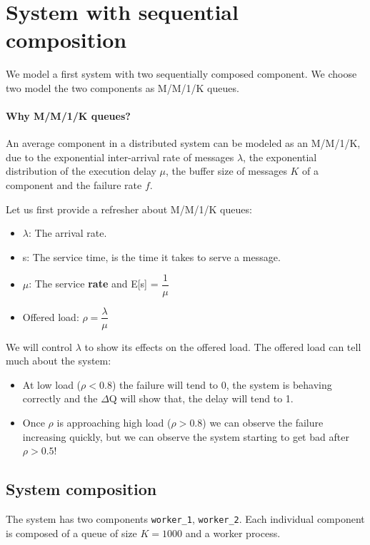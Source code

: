 \section{System with sequential composition}
    We model a first system with two sequentially composed component. We choose two model the two components as M/M/1/K queues. 
   
   \paragraph{Why M/M/1/K queues?} An average component in a distributed system can be modeled as an M/M/1/K, due to the exponential inter-arrival rate of messages $\lambda$, the exponential distribution of the execution delay $\mu$, the buffer size of messages $K$ of a component and the failure rate $f$. \cite{dq-tut}
    
    Let us first provide a refresher about M/M/1/K queues:
    \begin{itemize}
        \item $\lambda$: The arrival rate.
        \item s: The service time, is the time it takes to serve a message.
        \item $\mu$: The service \textbf{rate} and E[s] = $\dfrac{1}{\mu}$
        \item Offered load: $\rho = \dfrac{\lambda}{\mu}$
    \end{itemize}

    We will control $\lambda$ to show its effects on the offered load. The offered load can tell much about the system:
    \begin{itemize}
        \item At low load ($\rho < 0.8$) the failure will tend to 0, the system is behaving correctly and the $\Delta$Q will show that, the delay will tend to 1.
        \item Once $\rho$ is approaching high load ($\rho > 0.8$) we can observe the failure increasing quickly, but we can observe the system starting to get bad after $\rho > 0.5$! \cite{dq-tut}
    \end{itemize}
    
    \subsection{System composition}
    The system has two components \texttt{worker\_1}, \texttt{worker\_2}. Each individual component is composed of a queue of size $K = 1000$ and a worker process.
    
